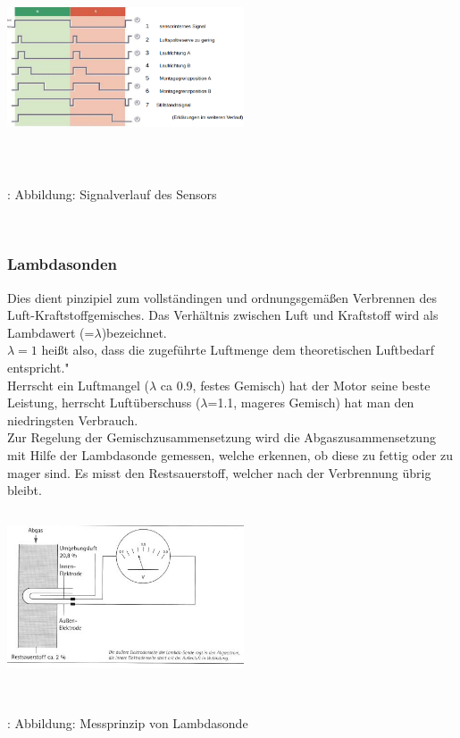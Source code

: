\documentclass{article}
\begin{document}
				\begin{center}
					\includegraphics[width=7cm, height=5cm] {Images/Kapitel5/signalverlauf_hall.png}
					\caption {\\\cite{TS28}: Abbildung: Signalverlauf des Sensors}
				\end{center}\\

			\subsubsection{Lambdasonden}
				Dies dient pinzipiel zum vollständingen und ordnungsgemäßen Verbrennen des Luft-Kraftstoffgemisches. Das Verhältnis zwischen Luft und Kraftstoff wird als Lambdawert (=$\lambda$)bezeichnet.\\
				$\lambda = 1$ heißt also, dass die zugeführte Luftmenge dem theoretischen Luftbedarf entspricht."\cite{TS29}\\
				Herrscht ein Luftmangel ($\lambda$ ca 0.9, festes Gemisch) hat der Motor seine beste Leistung, herrscht Luftüberschuss ($\lambda$=1.1, mageres Gemisch) hat man den niedringsten Verbrauch.\\
				Zur Regelung der Gemischzusammensetzung wird die Abgaszusammensetzung mit Hilfe der Lambdasonde gemessen, welche erkennen, ob diese zu fettig oder zu mager sind. Es misst den Restsauerstoff, welcher nach der Verbrennung übrig bleibt. 			
			
				\begin{center}
					\includegraphics[width=7cm, height=5cm] {Images/Kapitel5/lambdasonde.png}
					\caption {\\\cite{TS30}: Abbildung: Messprinzip von Lambdasonde}
				\end{center}\\
			
\end{document}
